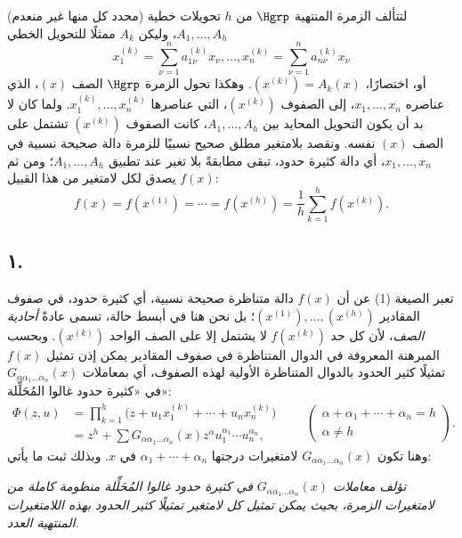 \documentclass[11pt]{article}
\begin{document}
لتتألف الزمرة المنتهية $\Hgrp$ من $h$ تحويلات خطية (محدد كل منها غير منعدم) $A_1,\ldots,A_h$، وليكن $A_k$ ممثلًا للتحويل الخطي
\[
  x_1^{(k)}=\sum_{\nu=1}^{n}a_{1\nu}^{(k)}x_\nu,\ldots,
  x_n^{(k)}=\sum_{\nu=1}^{n}a_{n\nu}^{(k)}x_\nu
\]
أو، اختصارًا، $(x^{(k)})=A_k(x)$. وهكذا تحول الزمرة $\Hgrp$ الصف $(x)$، الذي عناصره $x_1,\ldots,x_n$، إلى الصفوف $(x^{(k)})$، التي عناصرها $x_1^{(k)},\ldots,x_n^{(k)}$. ولما كان لا بد أن يكون التحويل المحايد بين $A_1,\ldots,A_h$، كانت الصفوف $(x^{(k)})$ تشتمل على الصف $(x)$ نفسه. ونقصد بلامتغير مطلق صحيح نسبيًا للزمرة دالة صحيحة نسبية في $x_1,\ldots,x_n$، أي دالة كثيرة حدود، تبقى مطابقةً بلا تغير عند تطبيق $A_1,\ldots,A_h$؛ ومن ثم يصدق لكل لامتغير من هذا القبيل $f(x)$:
\begin{equation}
  f(x)=f(x^{(1)})=\cdots=f(x^{(h)})=
  \frac1h\sum_{k=1}^{h}f(x^{(k)}).
\tag{1}
\end{equation}

\subsection*{١.}
تعبر الصيغة (1) عن أن $f(x)$ دالة متناظرة صحيحة نسبية، أي كثيرة حدود، في صفوف المقادير $(x^{(1)}),\ldots,(x^{(h)})$؛ بل نحن هنا في أبسط حالة، تسمى عادةً \emph{أحادية الصف}، لأن كل حد $f(x^{(k)})$ لا يشتمل إلا على الصف الواحد $(x^{(k)})$. وبحسب المبرهنة المعروفة في الدوال المتناظرة في صفوف المقادير يمكن إذن تمثيل $f(x)$ تمثيلًا كثير الحدود بالدوال المتناظرة الأولية لهذه الصفوف، أي بمعاملات $G_{\alpha\alpha_1\ldots\alpha_n}(x)$ في «كثيرة حدود غالوا المُحَلِّلة»:
\[
\begin{aligned}
  \Phi(z,u)
  &=\prod_{k=1}^{h}\bigl(z+u_1x_1^{(k)}+\cdots+u_nx_n^{(k)}\bigr) \\
  &=z^h+
    \sum G_{\alpha\alpha_1\ldots\alpha_n}(x)
    z^{\alpha}u_1^{\alpha_1}\cdots u_n^{\alpha_n},
\end{aligned}
\qquad
\left(\begin{array}{c}
\alpha+\alpha_1+\cdots+\alpha_n=h\\
\alpha\ne h
\end{array}\right).
\]
وهنا تكون $G_{\alpha\alpha_1\ldots\alpha_n}(x)$ لامتغيرات درجتها $\alpha_1+\cdots+\alpha_n$ في $x$. وبذلك ثبت ما يأتي:

\emph{تؤلف معاملات $G_{\alpha\alpha_1\ldots\alpha_n}(x)$ في كثيرة حدود غالوا المُحَلِّلة منظومة كاملة من لامتغيرات الزمرة، بحيث يمكن تمثيل كل لامتغير تمثيلًا كثير الحدود بهذه اللامتغيرات المنتهية العدد.}
\end{document}
